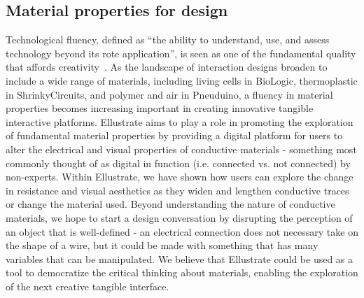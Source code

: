 \documentclass{sigchi}
\begin{document}
\subsection{Material properties for design}
Technological fluency, defined as ``the ability to understand, use, and assess technology beyond its rote application'', is seen as one of the fundamental quality that affords creativity~\cite{Lukens:2011jl}. As the landscape of interaction designs broaden to include a wide range of materials, including living cells in BioLogic, thermoplastic in ShrinkyCircuits, and polymer and air in Pneuduino, a fluency in material properties becomes increasing important in creating innovative tangible interactive platforms. Ellustrate aims to play a role in promoting the exploration of fundamental material properties by providing a digital platform for users to alter the electrical and visual properties of conductive materials - something most commonly thought of as digital in function (i.e. connected vs. not connected) by non-experts. Within Ellustrate, we have shown how users can explore the change in resistance and visual aesthetics as they widen and lengthen conductive traces or change the material used. Beyond understanding the nature of conductive materials, we hope to start a design conversation by disrupting the perception of an object that is well-defined - an electrical connection does not necessary take on the shape of a wire, but it could be made with something that has many variables that can be manipulated. We believe that Ellustrate could be used as a tool to democratize the critical thinking about materials, enabling the exploration of the next creative tangible interface. 


\end{document}
